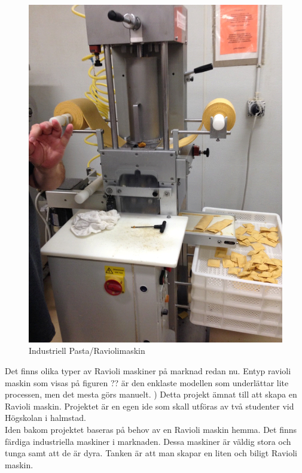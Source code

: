  		\begin{figure}[h]
 			\begin{center}
 				\includegraphics[scale=0.5]{images/ravioli_maskin.png}
 				\caption{Industriell Pasta/Raviolimaskin}
 				\label{pastamaskin}	
 			\end{center}
 		\end{figure}
		

Det finns olika typer av Ravioli maskiner på marknad redan nu. Entyp ravioli maskin som visas på figuren ?? är den enklaste modellen som underlättar lite processen, men det mesta görs manuelt. )
Detta projekt  ämnat till att skapa en Ravioli maskin. Projektet är en egen ide som skall utföras av två studenter vid Högskolan i halmstad.\\ 


Iden bakom projektet baseras på behov av en Ravioli maskin hemma.
Det finns färdiga industriella maskiner i marknaden. Dessa maskiner är väldig stora och tunga samt att de är dyra. 
Tanken är att man skapar en liten och biligt Ravioli maskin.		